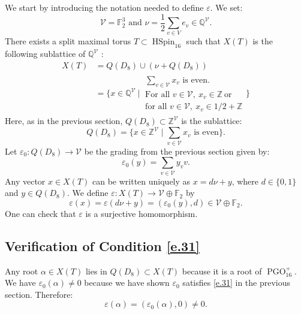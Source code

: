 \documentclass[12pt]{amsart}
\numberwithin{equation}{section}
\theoremstyle{definition}
\newcommand{\cV}{\mathcal{V}}
\newcommand{\bF}{\mathbb{F}}
\newcommand{\bQ}{\mathbb{Q}}
\newcommand{\bZ}{\mathbb{Z}}
\newcommand{\PGO}{\operatorname{PGO}}
\newcommand{\eps}{\varepsilon}
\newcommand{\HSpin}{\operatorname{HSpin}}
\begin{document}
We start by introducing the notation needed to define $\eps$. We set: $$\cV=\bF_2^{3} \text{ and } \nu = \frac{1}{2}\sum_{v\in V} e_v\in \bQ^\cV.$$  There exists a split maximal torus $T\subset \HSpin_{16}$ such that $X(T)$ is the following sublattice of $\bQ^{\cV}$ \cite[Section 3]{macdonald}: 
\begin{align}\label{e.D8_in_E8_lattice}
    X(T)  &= Q(D_8) \cup (\nu +Q(D_8)) \\
        &= \bigg\{ x\in\bQ^{\cV}\  {\Big|}\   \begin{matrix} \sum_{v\in \cV} x_v \text{ is even.}
            \\ \text{For all }v\in \cV, \ x_v\in \bZ  \ \text{or} 
            \\ \text{for all }v\in \cV, \ x_v \in 1/2+\bZ
\end{matrix}\bigg\}     
\end{align}
Here, as in the previous section, $Q(D_8)\subset \bZ^{\cV}$ is the sublattice:
$$Q(D_8) = \{ x\in \bZ^{\cV} \mid \sum_{v\in \cV} x_v \text{ is even}\}.$$
Let $\eps_0 :Q(D_8) \to \cV$ be the grading from the previous section given by:
$$\eps_0 (y)= \sum_{v\in \cV}y_v v.$$
Any vector $x \in X(T)$ can be written uniquely as $x =d\nu + y$, where $d \in \{0,1\}$ and $y\in Q(D_8)$. 
We define $\eps: X(T) \to \cV\oplus \bF_2$  by 
\begin{equation}\label{e.def_eps_E8}
    \eps(x) =\eps(d\nu + y) = (\eps_0(y), d) \in \cV \oplus \bF_2.
\end{equation}
One can check that $\eps$ is a surjective homomorphism. 
\subsection*{Verification of Condition \eqref{e.31}}
Any root $\alpha\in X(T)$ lies in $Q(D_8) \subset X(T)$ because it is a root of $\PGO^{+}_{16}$. We have $\eps_0(\alpha)\neq 0$ because we have shown $\eps_0$ satisfies \eqref{e.31} in the previous section. Therefore:
$$\eps(\alpha) = (\eps_0(\alpha),0)\neq 0.$$
\end{document}
